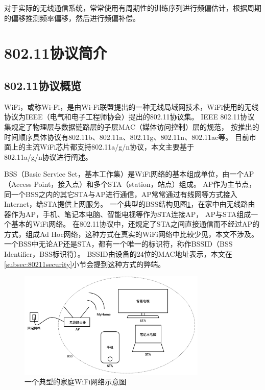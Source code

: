 		对于实际的无线通信系统，常常使用有周期性的训练序列进行频偏估计，根据周期的偏移推测频率偏移，然后进行频偏补偿。

	\section{802.11协议简介}\label{sec:80211protocol}
		\subsection{802.11协议概览}
		WiFi，或称Wi-Fi，是由Wi-Fi联盟提出的一种无线局域网技术，WiFi使用的无线协议为IEEE（电气和电子工程师协会）提出的802.11协议集。
		IEEE 802.11协议集规定了物理层与数据链路层的子层MAC（媒体访问控制）层的规范，
		按推出的时间顺序具体协议有802.11b、802.11a、802.11g、802.11n、802.11ac等。
		目前市面上的主流WiFi芯片都支持802.11a/g/n协议，本文主要基于\\802.11a/g/n协议进行阐述。

		BSS（Basic Service Set，基本工作集）是WiFi网络的基本组成单位，由一个AP（Access Point，接入点）和多个STA（station，站点）组成\cite{wikibss}。
		AP作为主节点，同一个BSS之内的其它STA与AP进行通信，AP常常通过有线网等方式接入Internet，给STA提供上网服务。
		一个典型的BSS结构见图\ref{fig:80211_BSS}，在家中由无线路由器作为AP，手机、笔记本电脑、智能电视等作为STA连接AP，
		AP与STA组成一个基本的WiFi网络。
		在802.11协议中，还规定了STA之间直接通信而不经过AP的方式，组成Ad Hoc网络，这种方式在真实的WiFi网络中比较少见，本文不涉及。
		一个BSS中无论AP还是STA，都有一个唯一的标识符，称作BSSID（BSS Identifier，BSS标识符）。
		BSSID由设备的24位的MAC地址表示，本文在\ref{subsec:80211security}小节会提到这种方式的弊端。

			\begin{figure}[H]
				\centering
				\includegraphics[width=0.8\textwidth]{img/80211_BSS.png}
				\caption{一个典型的家庭WiFi网络示意图}
				\label{fig:80211_BSS}
			\end{figure}

